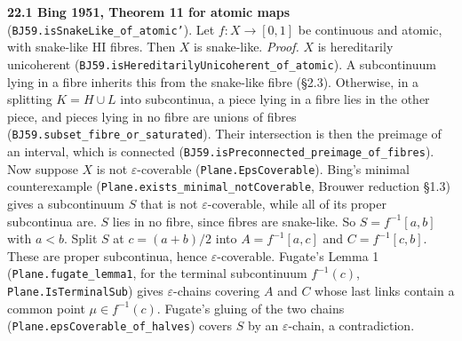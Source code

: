 \documentclass[11pt]{article}
\newcommand{\lean}[1]{\texttt{#1}}
\begin{document}
\textbf{22.1 Bing 1951, Theorem 11 for atomic maps} (\lean{BJ59.\hspace{0pt}isSnakeLike\_\hspace{0pt}of\_\hspace{0pt}atomic'}). Let $f : X \to [0, 1]$ be continuous and atomic, with snake-like HI fibres. Then $X$ is snake-like. \emph{Proof.} $X$ is hereditarily unicoherent (\lean{BJ59.\hspace{0pt}isHereditarilyUnicoherent\_\hspace{0pt}of\_\hspace{0pt}atomic}). A subcontinuum lying in a fibre inherits this from the snake-like fibre (\S{}2.3). Otherwise, in a splitting $K = H \cup L$ into subcontinua, a piece lying in a fibre lies in the other piece, and pieces lying in no fibre are unions of fibres (\lean{BJ59.\hspace{0pt}subset\_\hspace{0pt}fibre\_\hspace{0pt}or\_\hspace{0pt}saturated}). Their intersection is then the preimage of an interval, which is connected (\lean{BJ59.\hspace{0pt}isPreconnected\_\hspace{0pt}preimage\_\hspace{0pt}of\_\hspace{0pt}fibres}). Now suppose $X$ is not $\varepsilon$-coverable (\lean{Plane.\hspace{0pt}EpsCoverable}). Bing's minimal counterexample (\lean{Plane.\hspace{0pt}exists\_\hspace{0pt}minimal\_\hspace{0pt}notCoverable}, Brouwer reduction \S{}1.3) gives a subcontinuum $S$ that is not $\varepsilon$-coverable, while all of its proper subcontinua are. $S$ lies in no fibre, since fibres are snake-like. So $S = f^{-1}[a, b]$ with $a < b$. Split $S$ at $c = (a + b)/2$ into $A = f^{-1}[a, c]$ and $C = f^{-1}[c, b]$. These are proper subcontinua, hence $\varepsilon$-coverable. Fugate's Lemma 1 (\lean{Plane.\hspace{0pt}fugate\_\hspace{0pt}lemma1}, for the terminal subcontinuum $f^{-1}(c)$, \lean{Plane.\hspace{0pt}IsTerminalSub}) gives $\varepsilon$-chains covering $A$ and $C$ whose last links contain a common point $\mu \in f^{-1}(c)$. Fugate's gluing of the two chains (\lean{Plane.\hspace{0pt}epsCoverable\_\hspace{0pt}of\_\hspace{0pt}halves}) covers $S$ by an $\varepsilon$-chain, a contradiction.
\end{document}
